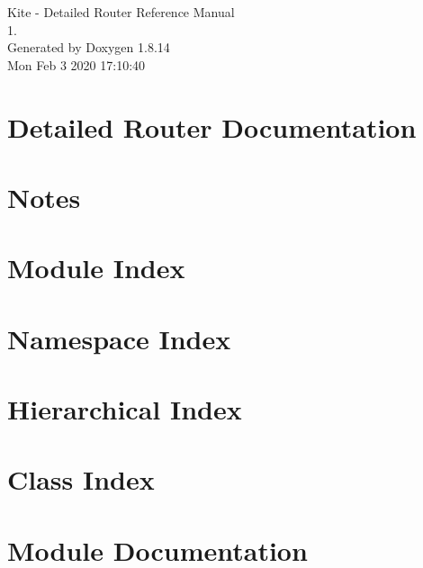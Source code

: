 \documentclass[a4paper]{asimbook}
\begin{document}
   \begin{titlepage}
     \vspace*{7cm}
     \begin{center}
     {\Large Kite -\/ Detailed Router Reference Manual\\[1ex]\large 1. }\\
     \vspace*{1cm}
     {\large Generated by Doxygen 1.8.14}\\
     \vspace*{0.5cm}
     {\small Mon Feb 3 2020 17:10:40}\\
     \end{center}
   \end{titlepage}

   \clearemptydoublepage

   \tableofcontents
   \clearemptydoublepage

\section{Detailed Router Documentation}
\label{index}\hypertarget{index}{}
\section{Notes}
\label{pageNotes}

\section{Module Index}

\section{Namespace Index}

\section{Hierarchical Index}

\section{Class Index}

\section{Module Documentation}


\end{document}
